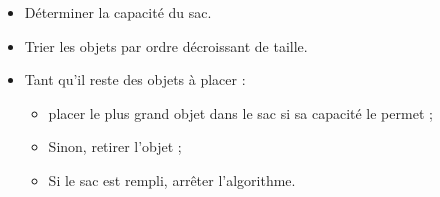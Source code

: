 
\begin{itemize}
\item Déterminer la capacité du sac.
\item Trier les objets par ordre décroissant de taille.
\item Tant qu'il reste des objets à placer :
  \begin{itemize}
  \item placer le plus grand objet dans le sac si sa capacité le permet ;
  \item Sinon, retirer l'objet ;
  \item Si le sac est rempli, arrêter l'algorithme.
  \end{itemize}
\end{itemize}
